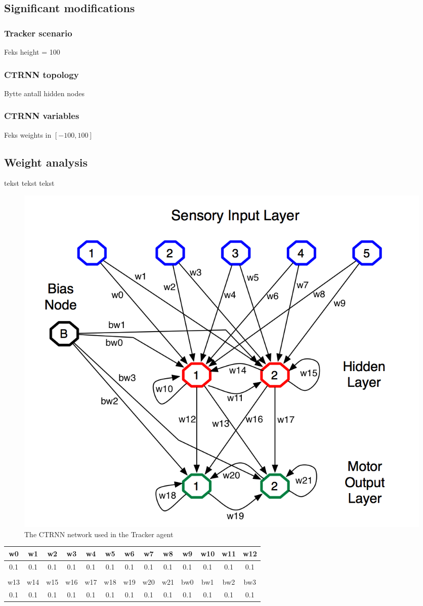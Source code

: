 \subsection{Significant modifications}
\subsubsection{Tracker scenario}
Feks height = 100

\subsubsection{CTRNN topology}
Bytte antall hidden nodes

\subsubsection{CTRNN variables}
Feks weights in $[-100, 100]$

\subsection{Weight analysis}
tekst tekst tekst

\begin{figure}[h]
  \centering
    \includegraphics[width=1.0\textwidth]{img/CTRNN}
    \caption{The CTRNN network used in the Tracker agent}
\end{figure}

\begin{tabular}{c | c | c | c | c | c | c | c | c | c | c | c | c }

w0  & w1  & w2  & w3  & w4  & w5  & w6  & w7  & w8  & w9  & w10 & w11 & w12 \\
\hline
0.1 & 0.1 & 0.1 & 0.1 & 0.1 & 0.1 & 0.1 & 0.1 & 0.1 & 0.1 & 0.1 & 0.1 & 0.1 \\ \\

w13 & w14 & w15 & w16 & w17 & w18 & w19 & w20 & w21 & bw0 & bw1 & bw2 & bw3 \\
\hline
0.1 & 0.1 & 0.1 & 0.1 & 0.1 & 0.1 & 0.1 & 0.1 & 0.1 & 0.1 & 0.1 & 0.1 & 0.1 \\

\end{tabular}
